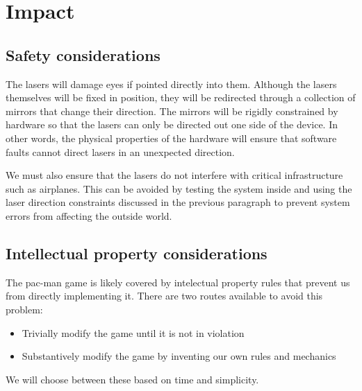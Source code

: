\documentclass[10pt]{article}
\begin{document}
\begin{comment}
  | A fan                      | $10.93 | \href{http://www.digikey.com/product-detail/en/EFB0612HHA/603-1026-ND/1014357?WT.mc_id=IQ_7595_G_pla1014357}{Potential fan}                                               |   |
  | Mirror                     | $12.02 | \href{http://www.onlinemetals.com/merchant.cfm?pid=7895&step=4&id=735&Cj0KEQjwvve_BRDmg9Kt9ufO15EBEiQAKoc6qk8IH2ER5s-AwA1TZpkKCJNiQJXJGtpEh3BDggOUHxoaApnE8P8HAQ}{Mirror} |   |
  | Speaker Actuator           | $0.00  | Will be salvaged                                                                                                                                                          |   |
  | TOTAL                      | $76.27 |                                                                                                                                                                           |   |
\end{comment}

\section{Impact}
\subsection{Safety considerations}
The lasers will damage eyes if pointed directly into them.
Although the lasers themselves will be fixed in position, they will be redirected through a collection of mirrors that change their direction.
The mirrors will be rigidly constrained by hardware so that the lasers can only be directed out one side of the device.
In other words, the physical properties of the hardware will ensure that software faults cannot direct lasers in an unexpected direction.

We must also ensure that the lasers do not interfere with critical infrastructure such as airplanes.
This can be avoided by testing the system inside and using the laser direction constraints discussed in the previous paragraph to prevent system errors from affecting the outside world.
\subsection{Intellectual property considerations}
The pac-man game is likely covered by intelectual property rules that prevent us from directly implementing it.
There are two routes available to avoid this problem:
\begin{itemize}
  \item Trivially modify the game until it is not in violation
  \item Substantively modify the game by inventing our own rules and mechanics
\end{itemize}
We will choose between these based on time and simplicity.
\end{document}

